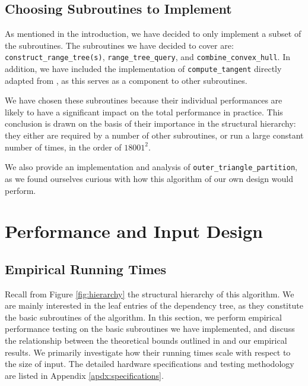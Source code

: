 \documentclass{article}
\newcommand{\figref}[1]{Figure \ref{#1}}
\newcommand{\apdxref}[1]{Appendix \ref{#1}}
\begin{document}
\subsection{Choosing Subroutines to Implement}

As mentioned in the introduction, we have decided to only implement a subset of the subroutines. The subroutines we have decided to cover are: \texttt{construct\_range\_tree(s)}, \texttt{range\_tree\_query}, and \texttt{combine\_convex\_hull}. In addition, we have included the implementation of \texttt{compute\_tangent} directly adapted from \cite{ks95}, as this serves as a component to other subroutines. 

We have chosen these subroutines because their individual performances are likely to have a significant impact on the total performance in practice. This conclusion is drawn on the basis of their importance in the structural hierarchy: they either are required by a number of other subroutines, or run a large constant number of times, in the order of $18001^2$.

We also provide an implementation and analysis of \texttt{outer\_triangle\_partition}, as we found ourselves curious with how this algorithm of our own design would perform. %

\newpage

\section{Performance and Input Design} \label{sec:performance_and_input_design}


\subsection{Empirical Running Times} \label{sub:empirical_running_times}

Recall from \figref{fig:hierarchy} the structural hierarchy of this algorithm. We are mainly interested in the leaf entries of the dependency tree, as they constitute the basic subroutines of the algorithm. In this section, we perform empirical performance testing on the basic subroutines we have implemented, and discuss the relationship between the theoretical bounds outlined in \cite{abb17} and our empirical results. We primarily investigate how their running times scale with respect to the size of input. The detailed hardware specifications and testing methodology are listed in \apdxref{apdx:specifications}.
\end{document}
